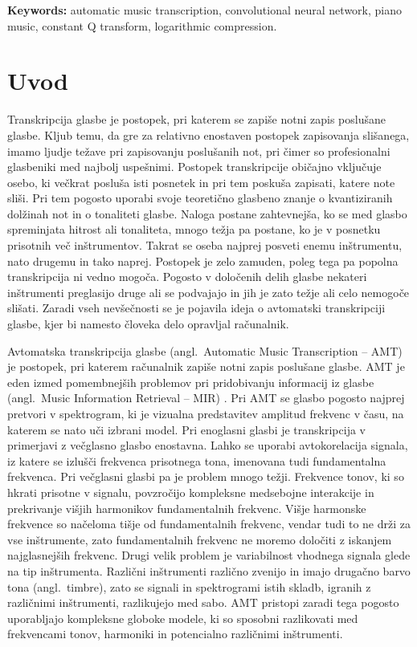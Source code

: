 \documentclass[a4paper, 12pt, openright]{book}
\newcommand{\en}{angl.}
\newcommand{\tkeywordsEn}{automatic music transcription, convolutional neural network, piano music, constant Q transform, logarithmic compression}
\newcommand{\clearemptydoublepage}{\newpage{\pagestyle{empty}\cleardoublepage}}
\begin{document}
\bigskip

\noindent\textbf{Keywords:} \tkeywordsEn.


\clearemptydoublepage


\mainmatter
\setcounter{page}{1}
\pagestyle{fancy}


\chapter{Uvod}

Transkripcija glasbe je postopek, pri katerem se zapiše notni zapis poslušane glasbe.
Kljub temu, da gre za relativno enostaven postopek zapisovanja slišanega, imamo ljudje težave pri zapisovanju poslušanih not, pri čimer so profesionalni glasbeniki med najbolj uspešnimi.
Postopek transkripcije običajno vključuje osebo, ki večkrat posluša isti posnetek in pri tem poskuša zapisati, katere note sliši.
Pri tem pogosto uporabi svoje teoretično glasbeno znanje o kvantiziranih dolžinah not in o tonaliteti glasbe.
Naloga postane zahtevnejša, ko se med glasbo spreminjata hitrost ali tonaliteta, mnogo težja pa postane, ko je v posnetku prisotnih več inštrumentov.
Takrat se oseba najprej posveti enemu inštrumentu, nato drugemu in tako naprej.
Postopek je zelo zamuden, poleg tega pa popolna transkripcija ni vedno mogoča.
Pogosto v določenih delih glasbe nekateri inštrumenti preglasijo druge ali se podvajajo in jih je zato težje ali celo nemogoče slišati.
Zaradi vseh nevšečnosti se je pojavila ideja o avtomatski transkripciji glasbe, kjer bi namesto človeka delo opravljal računalnik.

Avtomatska transkripcija glasbe (\en\ Automatic Music Transcription -- AMT) je postopek, pri katerem računalnik zapiše notni zapis poslušane glasbe.
AMT je eden izmed pomembnejših problemov pri pridobivanju informacij iz glasbe (\en\ Music Information Retrieval -- MIR) \cite{mirex}.
Pri AMT se glasbo pogosto najprej pretvori v spektrogram, ki je vizualna predstavitev amplitud frekvenc v času, na katerem se nato uči izbrani model.
Pri enoglasni glasbi je transkripcija v primerjavi z večglasno glasbo enostavna.
Lahko se uporabi avtokorelacija signala, iz katere se izlušči frekvenca prisotnega tona, imenovana tudi fundamentalna frekvenca.
Pri večglasni glasbi pa je problem mnogo težji.
Frekvence tonov, ki so hkrati prisotne v signalu, povzročijo kompleksne medsebojne interakcije in prekrivanje višjih harmonikov fundamentalnih frekvenc.
Višje harmonske frekvence so načeloma tišje od fundamentalnih frekvenc, vendar tudi to ne drži za vse inštrumente, zato fundamentalnih frekvenc ne moremo določiti z iskanjem najglasnejših frekvenc.
Drugi velik problem je variabilnost vhodnega signala glede na tip inštrumenta.
Različni inštrumenti različno zvenijo in imajo drugačno barvo tona (\en\ timbre), zato se signali in spektrogrami istih skladb, igranih z različnimi inštrumenti, razlikujejo med sabo.
AMT pristopi zaradi tega pogosto uporabljajo kompleksne globoke modele, ki so sposobni razlikovati med frekvencami tonov, harmoniki in potencialno različnimi inštrumenti.
\end{document}
